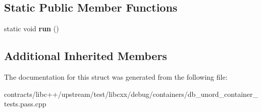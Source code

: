 \subsection*{Static Public Member Functions}
\begin{DoxyCompactItemize}
\item 
\mbox{\label{struct_unordered_container_checks_aba084b7f2af1c2ab9955c2c3cdc27f4c}} 
static void {\bfseries run} ()
\end{DoxyCompactItemize}
\subsection*{Additional Inherited Members}


The documentation for this struct was generated from the following file\+:\begin{DoxyCompactItemize}
\item 
contracts/libc++/upstream/test/libcxx/debug/containers/db\+\_\+unord\+\_\+container\+\_\+tests.\+pass.\+cpp\end{DoxyCompactItemize}
